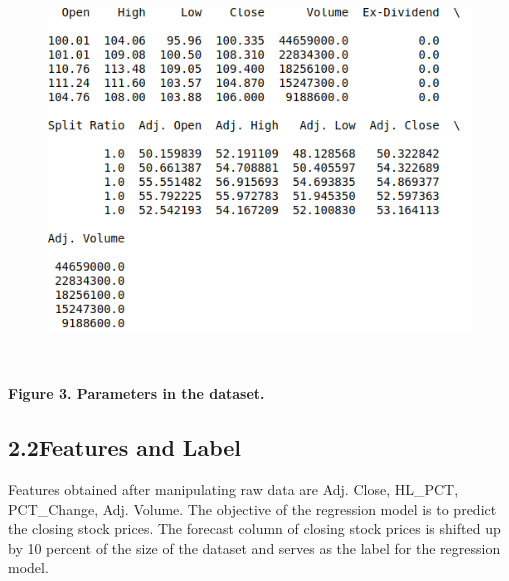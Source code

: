 \documentclass[12pt]{article}
\begin{document}
\begin{figure}[H]
	\begin{Center}
		\includegraphics[width=5.32in,height=4.07in]{./media/image5.png}
	\end{Center}
\end{figure}



\par

\begin{Center}
\textbf{Figure 3. Parameters in the dataset.}
\end{Center}\par


\vspace{\baselineskip}

\vspace{\baselineskip}
\subsection*{2.2\hspace*{10pt}Features and Label}

\vspace{\baselineskip}
Features obtained after manipulating raw data are Adj. Close, HL\_PCT, PCT\_Change, Adj. Volume. The objective of the regression model is to predict the closing stock prices. The forecast column of closing stock prices is shifted up by 10 percent of the size of the dataset and serves as the label for the regression model.\par
\end{document}
